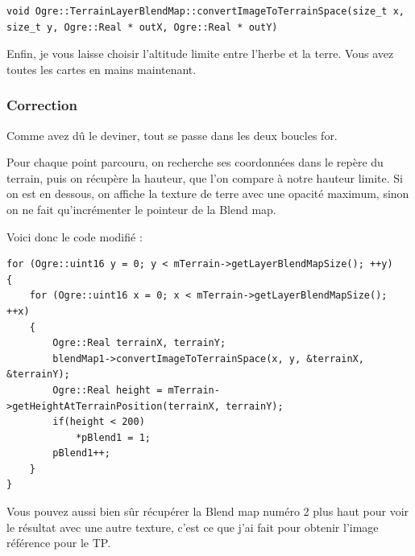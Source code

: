 \begin{lstlisting}[caption={M\'ethode convertImageToTerrainSpace pour convertir les coordonn\'ees de l'image en coordonn\'ees du terrain}]
void Ogre::TerrainLayerBlendMap::convertImageToTerrainSpace(size_t x, size_t y, Ogre::Real * outX, Ogre::Real * outY)
\end{lstlisting}


Enfin, je vous laisse choisir l'altitude limite entre l'herbe et la terre. Vous avez toutes les cartes en mains maintenant.

























\subsubsection{Correction}

Comme avez d\^u le deviner, tout se passe dans les deux boucles for.

Pour chaque point parcouru, on recherche ses coordonn\'ees dans le rep\`ere du terrain, puis on r\'ecup\`ere la hauteur, que l'on compare \`a notre hauteur limite. Si on est en dessous, on affiche la texture de terre avec une opacit\'e maximum, sinon on ne fait qu'incr\'ementer le pointeur de la Blend map.

Voici donc le code modifi\'e :

\begin{lstlisting}[caption={Attribution de la transparence d\'esir\'ee sur tous les points du calque selon leur position}]
for (Ogre::uint16 y = 0; y < mTerrain->getLayerBlendMapSize(); ++y)
{
    for (Ogre::uint16 x = 0; x < mTerrain->getLayerBlendMapSize(); ++x)
    {
        Ogre::Real terrainX, terrainY;
        blendMap1->convertImageToTerrainSpace(x, y, &terrainX, &terrainY);
        Ogre::Real height = mTerrain->getHeightAtTerrainPosition(terrainX, terrainY);
        if(height < 200)
            *pBlend1 = 1;
        pBlend1++;
    }
}
\end{lstlisting}

Vous pouvez aussi bien s\^ur r\'ecup\'erer la Blend map num\'ero 2 plus haut pour voir le r\'esultat avec une autre texture, c'est ce que j'ai fait pour obtenir l'image r\'ef\'erence pour le TP.








